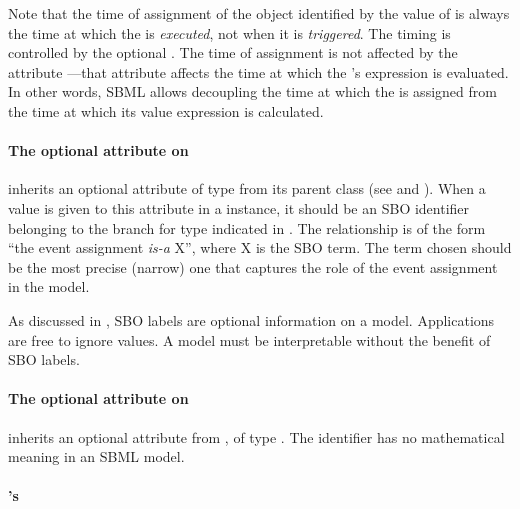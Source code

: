 Note that the time of assignment of the object identified by the
value of  is always the time at which the \Event
is \emph{executed}, not when it is \emph{triggered}.  The timing
is controlled by the optional \Delay.  The time of assignment is
not affected by the \Event attribute
---that attribute affects the time
at which the \EventAssignment's  expression is
evaluated.  In other words, SBML allows decoupling the time at
which the  is assigned from the time at which its
value expression is calculated.


\paragraph{The optional  attribute on }
\label{sec:eventassignment-sboterm}

\EventAssignment inherits an optional 
attribute of type  from its parent
class \SBase (see 
and ).  When a value is given to this
attribute in a  \EventAssignment  instance, it should be an
SBO identifier belonging to the branch for type  \EventAssignment 
indicated in .  The relationship is
of the form ``the event assignment \emph{is-a} X'', where X is
the SBO term.  The term chosen should be the most precise (narrow)
one that captures the role of the event assignment  in the model.

As discussed in , SBO labels are optional
information on a model.  Applications are free to ignore
 values.  A model must be interpretable without the
benefit of SBO labels.


\begin{blockChanged}
\paragraph{The optional  attribute on }
\label{sec:eventassignment-id}

\EventAssignment inherits an optional  attribute from \SBase, of type .  The identifier has no mathematical meaning in an SBML \thisLV model.

\end{blockChanged}


\paragraph{'s }

